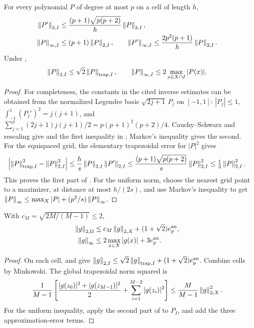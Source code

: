 \begin{lemma}
\label{lem:poly-sampling}
For every polynomial $P$ of degree at most $p$ on a cell of length $h$,
\begin{align}
 \left\lVert P'\right\rVert_{2,I}&\le\frac{(p+1)\sqrt{p(p+2)}}h\left\lVert P\right\rVert_{2,I},
 \label{eq:legendre-inverse}\\
 \left\lVert P\right\rVert_{\infty,I}&\le(p+1)\left\lVert P\right\rVert_{2,I},\qquad
 \left\lVert P'\right\rVert_{\infty,I}\le\frac{2p^2(p+1)}h\left\lVert P\right\rVert_{2,I}.
 \label{eq:linfty-inverse}
\end{align}
Under ,
\begin{equation}
 \left\lVert P\right\rVert_{2,I}\le\sqrt2\left\lVert P\right\rVert_{\mathrm{trap},I},\qquad
 \left\lVert P\right\rVert_{\infty,I}\le2\max_{x\in X\cap I}|P(x)|.
 \label{eq:P-trap}
\end{equation}
\end{lemma}
\begin{proof}
For completeness, the constants in the cited inverse estimates can be
obtained from the normalized Legendre basis
$\sqrt{2j+1}\,P_j$ on $[-1,1]$:
$|P_j|\le1$, $\int_{-1}^1(P_j')^2=j(j+1)$, and
$\sum_{j=1}^p(2j+1)j(j+1)/2=p(p+1)^2(p+2)/4$.
Cauchy--Schwarz and rescaling give  and the first
inequality in ; Markov's inequality gives the second.
For the equispaced grid, the elementary trapezoidal error for $|P|^2$ gives
\[
 \left|\left\lVert P\right\rVert_{\mathrm{trap},I}^2-\left\lVert P\right\rVert_{2,I}^2\right|
 \le\frac hs\left\lVert P\right\rVert_{2,I}\left\lVert P'\right\rVert_{2,I}
 \le\frac{(p+1)\sqrt{p(p+2)}}s\left\lVert P\right\rVert_{2,I}^2
 \le\tfrac12\left\lVert P\right\rVert_{2,I}^2.
\]
This proves the first part of . For the uniform norm,
choose the nearest grid point to a maximizer, at distance at most $h/(2s)$,
and use Markov's inequality to get
$\left\lVert P\right\rVert_\infty\le\max_X|P|+(p^2/s)\left\lVert P\right\rVert_\infty$.
\end{proof}

\begin{lemma}
\label{lem:rms-transfer}
With $c_M=\sqrt{2M/(M-1)}\le2$,
\begin{align}
 \left\lVert g\right\rVert_{2,\Omega}&\le c_M\left\lVert g\right\rVert_{2,X}+(1+\sqrt2)e_p^{\rm an},
 \label{eq:rms-transfer}\\
 \left\lVert g\right\rVert_\infty&\le2\max_{x\in X}|g(x)|+3e_p^{\rm an}.
 \label{eq:uniform-transfer}
\end{align}
\end{lemma}
\begin{proof}
On each cell,  and  give
$\left\lVert g\right\rVert_{2,I}\le\sqrt2\left\lVert g\right\rVert_{\mathrm{trap},I}+(1+\sqrt2)e_p^{\rm an}$.
Combine cells by Minkowski. The global trapezoidal norm squared is
\[
 \frac1{M-1}\left[\frac{|g(z_0)|^2+|g(z_{M-1})|^2}2
                       +\sum_{i=1}^{M-2}|g(z_i)|^2\right]
 \le\frac M{M-1}\left\lVert g\right\rVert_{2,X}^2.
\]
For the uniform inequality, apply the second part of  to
$P_I$, and add the three approximation-error terms.
\end{proof}

